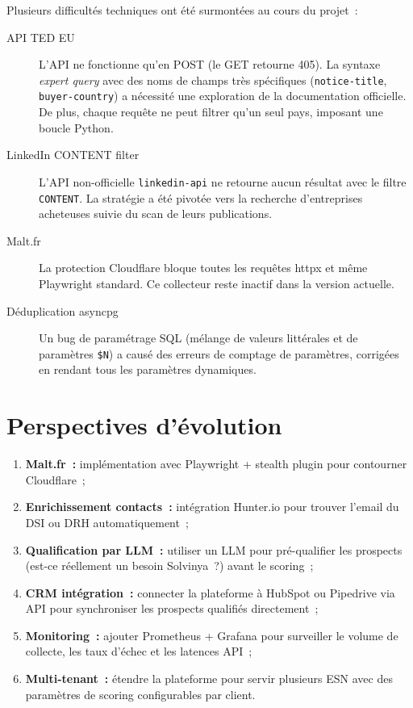 Plusieurs difficultés techniques ont été surmontées au cours du projet~:

\begin{description}
  \item[API TED EU] L'API ne fonctionne qu'en POST (le GET retourne 405). La
    syntaxe \emph{expert query} avec des noms de champs très spécifiques
    (\texttt{notice-title}, \texttt{buyer-country}) a nécessité une exploration
    de la documentation officielle. De plus, chaque requête ne peut filtrer
    qu'un seul pays, imposant une boucle Python.

  \item[LinkedIn CONTENT filter] L'API non-officielle \texttt{linkedin-api} ne
    retourne aucun résultat avec le filtre \texttt{CONTENT}. La stratégie a été
    pivotée vers la recherche d'entreprises acheteuses suivie du scan de leurs
    publications.

  \item[Malt.fr] La protection Cloudflare bloque toutes les requêtes httpx et
    même Playwright standard. Ce collecteur reste inactif dans la version
    actuelle.

  \item[Déduplication asyncpg] Un bug de paramétrage SQL (mélange de valeurs
    littérales et de paramètres \texttt{\$N}) a causé des erreurs de comptage de
    paramètres, corrigées en rendant tous les paramètres dynamiques.
\end{description}

\section*{Perspectives d'évolution}

\begin{enumerate}
  \item \textbf{Malt.fr~:} implémentation avec Playwright + stealth plugin pour
        contourner Cloudflare~;
  \item \textbf{Enrichissement contacts~:} intégration Hunter.io pour trouver
        l'email du DSI ou DRH automatiquement~;
  \item \textbf{Qualification par LLM~:} utiliser un LLM pour pré-qualifier les
        prospects (est-ce réellement un besoin Solvinya~?) avant le scoring~;
  \item \textbf{CRM intégration~:} connecter la plateforme à HubSpot ou Pipedrive
        via API pour synchroniser les prospects qualifiés directement~;
  \item \textbf{Monitoring~:} ajouter Prometheus + Grafana pour surveiller le
        volume de collecte, les taux d'échec et les latences API~;
  \item \textbf{Multi-tenant~:} étendre la plateforme pour servir plusieurs ESN
        avec des paramètres de scoring configurables par client.
\end{enumerate}


